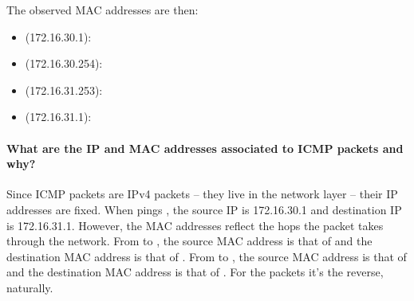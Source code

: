 \documentclass[compilation.tex]{subfiles}
\begin{document}
The observed MAC addresses are then:
\begin{itemize}[noitemsep,leftmargin=*,topsep=0pt]
\item {} (172.16.30.1): 
\item {} (172.16.30.254): 
\item {} (172.16.31.253): 
\item {} (172.16.31.1): 
\end{itemize}

\paragraph{What are the IP and MAC addresses associated to ICMP packets and why?}
Since ICMP packets are IPv4 packets -- they live in the network layer -- their IP addresses are fixed.
When  pings , the source IP is 172.16.30.1 and destination IP is 172.16.31.1.
However, the MAC addresses reflect the hops the packet takes through the network.
From  to , the source MAC address is that of  and the destination MAC address is that of .
From  to , the source MAC address is that of  and the destination MAC address is that of .
For the  packets it's the reverse, naturally.
\end{document}
